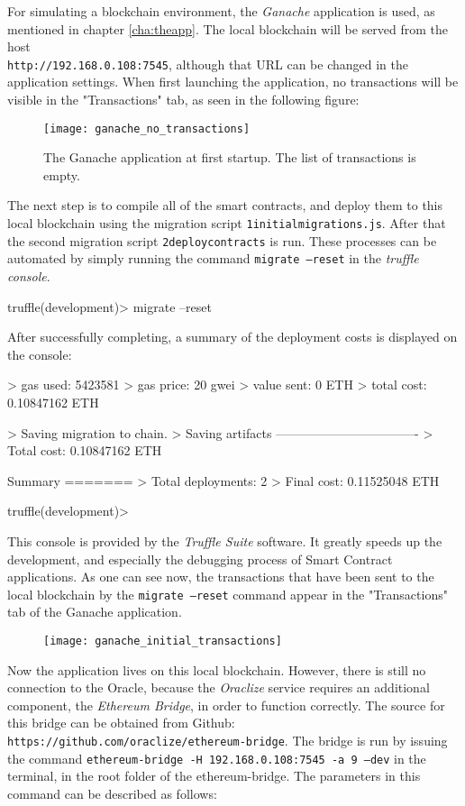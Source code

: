 For simulating a blockchain environment, the \emph{Ganache} application is used, as mentioned in chapter \ref{cha:theapp}. The local blockchain will be served from the host \\
\texttt{http://192.168.0.108:7545}, although that URL can be changed in the application settings. When first launching the application, no transactions will be visible in the "Transactions" tab, as seen in the following figure:
\begin{figure}[H]
\centering
\texttt{[image: ganache\_no\_transactions]}
\caption{The Ganache application at first startup. The list of transactions is empty.}
\end{figure}
The next step is to compile all of the smart contracts, and deploy them to this local blockchain using the migration script \texttt{1\textunderscore initial\textunderscore migrations.js}. After that the second migration script \texttt{2\textunderscore deploy\textunderscore contracts} is run. These processes can be automated by simply running the command \texttt{migrate --reset} in the \emph{truffle console}. 
\begin{GenericCode}[numbers=none]
truffle(development)> migrate --reset
\end{GenericCode}
After successfully completing, a summary of the deployment costs is displayed on the console:
\begin{GenericCode}[numbers=none]
	> gas used:				5423581
	> gas price:			20 gwei
	> value sent:			0 ETH
	> total cost:			0.10847162 ETH
	
	
	
	> Saving migration to chain.
	> Saving artifacts
	----------------------------------
	> Total cost:			0.10847162 ETH
	
	
Summary
=======
> Total deployments:	2
> Final cost:					0.11525048 ETH

truffle(development)> 
\end{GenericCode}
This console is provided by the \emph{Truffle Suite} software. It greatly speeds up the development, and especially the debugging process of Smart Contract applications. As one can see now, the transactions that have been sent to the local blockchain by the \texttt{migrate --reset} command appear in the "Transactions" tab of the Ganache application.
\begin{figure}[H]
\centering
\texttt{[image: ganache\_initial\_transactions]}
\end{figure}
Now the application lives on this local blockchain. However, there is still no connection to the Oracle, because the \emph{Oraclize} service requires an additional component, the \emph{Ethereum Bridge}, in order to function correctly. The source for this bridge can be obtained from Github: \texttt{https://github.com/oraclize/ethereum-bridge}. The bridge is run by issuing the command \texttt{ethereum-bridge -H 192.168.0.108:7545 -a 9 --dev} in the terminal, in the root folder of the ethereum-bridge. The parameters in this command can be described as follows:
